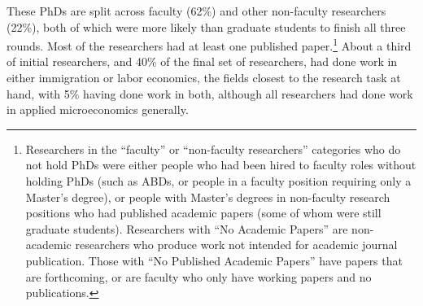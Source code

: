 \documentclass[
  letterpaper,
  DIV=11,
  numbers=noendperiod]{scrartcl}
\begin{document}
These PhDs are split across faculty (62\%) and other non-faculty
researchers (22\%), both of which were more likely than graduate
students to finish all three rounds. Most of the researchers had at
least one published paper.\footnote{Researchers in the ``faculty'' or
  ``non-faculty researchers'' categories who do not hold PhDs were
  either people who had been hired to faculty roles without holding PhDs
  (such as ABDs, or people in a faculty position requiring only a
  Master's degree), or people with Master's degrees in non-faculty
  research positions who had published academic papers (some of whom
  were still graduate students). Researchers with ``No Academic Papers''
  are non-academic researchers who produce work not intended for
  academic journal publication. Those with ``No Published Academic
  Papers'' have papers that are forthcoming, or are faculty who only
  have working papers and no publications.} About a third of initial
researchers, and 40\% of the final set of researchers, had done work in
either immigration or labor economics, the fields closest to the
research task at hand, with 5\% having done work in both, although all
researchers had done work in applied microeconomics generally.
\end{document}
